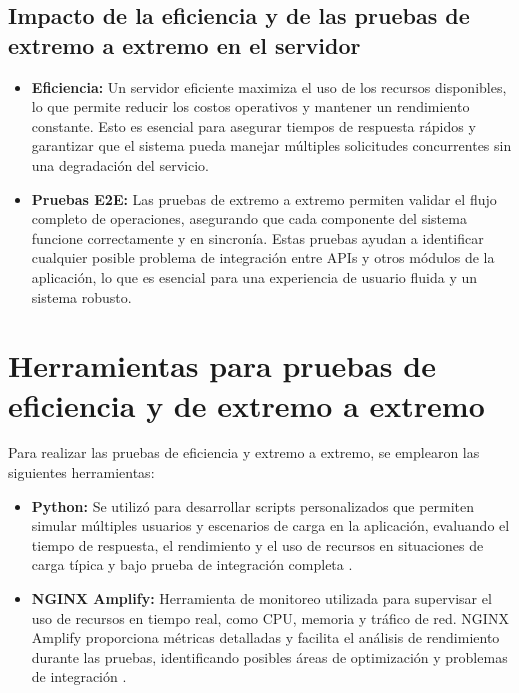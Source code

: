 \subsection{Impacto de la eficiencia y de las pruebas de extremo a extremo en el servidor}

\begin{itemize}
    \item \textbf{Eficiencia:} Un servidor eficiente maximiza el uso de los recursos disponibles, lo que permite reducir los costos operativos y mantener un rendimiento constante. Esto es esencial para asegurar tiempos de respuesta rápidos y garantizar que el sistema pueda manejar múltiples solicitudes concurrentes sin una degradación del servicio.

    \item \textbf{Pruebas E2E:} Las pruebas de extremo a extremo permiten validar el flujo completo de operaciones, asegurando que cada componente del sistema funcione correctamente y en sincronía. Estas pruebas ayudan a identificar cualquier posible problema de integración entre APIs y otros módulos de la aplicación, lo que es esencial para una experiencia de usuario fluida y un sistema robusto.
\end{itemize}

\section{Herramientas para pruebas de eficiencia y de extremo a extremo}

Para realizar las pruebas de eficiencia y extremo a extremo, se emplearon las siguientes herramientas:

\begin{itemize}
    \item \textbf{Python:} Se utilizó para desarrollar scripts personalizados que permiten simular múltiples usuarios y escenarios de carga en la aplicación, evaluando el tiempo de respuesta, el rendimiento y el uso de recursos en situaciones de carga típica y bajo prueba de integración completa \cite{PythonTesting}.
    \item \textbf{NGINX Amplify:} Herramienta de monitoreo utilizada para supervisar el uso de recursos en tiempo real, como CPU, memoria y tráfico de red. NGINX Amplify proporciona métricas detalladas y facilita el análisis de rendimiento durante las pruebas, identificando posibles áreas de optimización y problemas de integración \cite{NGINXAmplifyMonitoring}.
\end{itemize}

